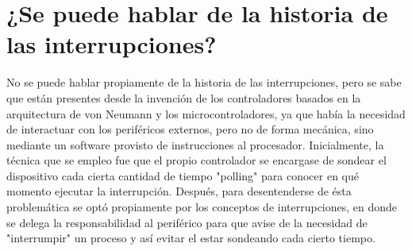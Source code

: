 \documentclass[12pt, letter]{article}
\begin{document}
\section*{¿Se puede hablar de la historia de las interrupciones?}

\setlength{\parindent}{31pt}
No se puede hablar propiamente de la historia de las interrupciones, pero se sabe que están presentes desde la invención de los controladores basados en la arquitectura de von Neumann y los microcontroladores, ya que había la necesidad de interactuar con los periféricos externos, pero no de forma mecánica, sino mediante un software provisto de instrucciones al procesador. Inicialmente, la técnica que se empleo fue que el propio controlador se encargase de sondear el dispositivo cada cierta cantidad de tiempo "polling" para conocer en qué momento ejecutar la interrupción. Después, para desentenderse de ésta problemática se optó propiamente por los conceptos de interrupciones, en donde se delega la responsabilidad al periférico para que avise de la necesidad de "interrumpir" un proceso y  así evitar el estar sondeando cada cierto tiempo.
\end{document}
